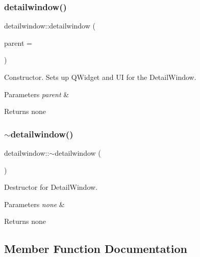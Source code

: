 \subsubsection{\texorpdfstring{detailwindow()}{detailwindow()}}
{\footnotesize\ttfamily detailwindow\+::detailwindow (\begin{DoxyParamCaption}\item[{Q\+Widget $\ast$}]{parent = {} }\end{DoxyParamCaption})\hspace{0.3cm}{\ttfamily [explicit]}}

Constructor. Sets up Q\+Widget and UI for the Detail\+Window. 
\begin{DoxyParams}{Parameters}
{\em parent} & \\
\hline
\end{DoxyParams}
\begin{DoxyReturn}{Returns}
none 
\end{DoxyReturn}
\mbox{\label{classdetailwindow_a4423d1b152631ad2bb6838b3a77f0315}} 
\subsubsection{\texorpdfstring{$\sim$detailwindow()}{~detailwindow()}}
{\footnotesize\ttfamily detailwindow\+::$\sim$detailwindow (\begin{DoxyParamCaption}{ }\end{DoxyParamCaption})}

Destructor for Detail\+Window. 
\begin{DoxyParams}{Parameters}
{\em none} & \\
\hline
\end{DoxyParams}
\begin{DoxyReturn}{Returns}
none 
\end{DoxyReturn}


\subsection{Member Function Documentation}
\mbox{\label{classdetailwindow_ab64a227e7c07e5dc17e7a0a29675544a}} 
